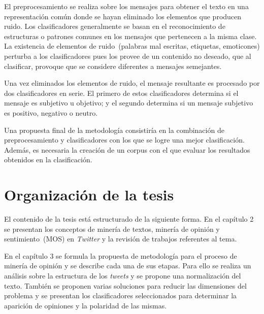 \begin{introduction}
El preprocesamiento se realiza sobre los mensajes para obtener el texto en una 
representación común donde se hayan eliminado los elementos que producen ruido.
Los clasificadores generalmente se basan en el reconocimiento de estructuras
o patrones comunes en los mensajes que pertenecen a la misma clase. La existencia
de elementos de ruido~(palabras mal escritas, etiquetas, emoticones) 
perturba a los clasificadores pues los provee de un contenido no deseado, que al clasificar,
provoque que se considere diferentes a mensajes semejantes.

Una vez eliminados los elementos de ruido, el mensaje resultante es procesado
por dos clasificadores en serie. El primero de estos clasificadores determina
si el mensaje es subjetivo u objetivo; y el segundo determina si un mensaje subjetivo
es positivo, negativo o neutro.


Una propuesta final de la metodología consistiría en la combinación de preprocesamiento y 
clasificadores con los que se logre una mejor clasificación. Además, es necesaria la
creación de un corpus con el que evaluar los resultados obtenidos en la clasificación.

        
\section*{Organización de la tesis}
El contenido de la tesis está estructurado de la siguiente forma. En el 
capítulo 2 se presentan los conceptos de minería de textos, minería de opinión
y sentimiento~(MOS) en \emph{Twitter} y la revisión de trabajos referentes al tema.   
 
En el capítulo 3 se formula la propuesta de metodología para el proceso de minería
de opinión y se describe cada una de sus etapas. Para ello se realiza un 
análisis sobre la estructura de los \emph{tweets} y se propone una normalización del texto.
También se proponen varias soluciones para reducir las dimensiones del 
problema y se presentan los clasificadores seleccionados para determinar 
la aparición de opiniones y la polaridad de las mismas. 


\end{introduction}
